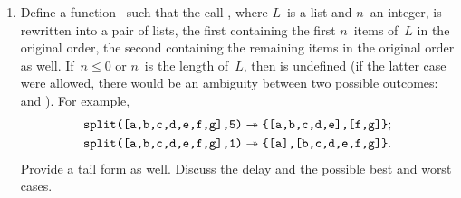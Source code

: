 \begin{enumerate}

  \item Define a function~ such that the call
    , where \(L\)~is a list and \(n\)~an
    integer, is rewritten into a pair of lists, the first containing
    the first \(n\)~items of~\(L\) in the original order, the second
    containing the remaining items in the original order as
    well. If~\(n \leqslant 0\) or \(n\)~is the length of~\(L\), then
     is undefined (if the latter case were
    allowed, there would be an ambiguity between two possible
    outcomes:  and ). For
    example,
    \begin{align*}
      \texttt{split([a,b,c,d,e,f,g],5)}
      &\twoheadrightarrow
      \texttt{\{[a,b,c,d,e],[f,g]\}};\\
      \texttt{split([a,b,c,d,e,f,g],1)}
      &\twoheadrightarrow
      \texttt{\{[a],[b,c,d,e,f,g]\}}.
    \end{align*}
    Provide a tail form as well. Discuss the delay and the possible
    best and worst cases. 


\end{enumerate}
